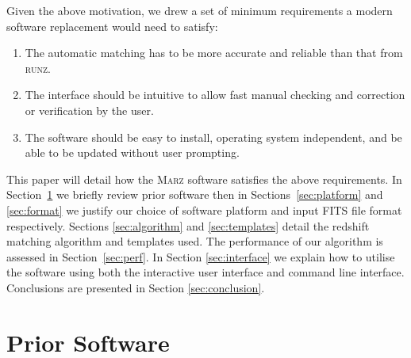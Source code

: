 \documentclass[5p]{elsarticle}
\newcommand{\runz}{\textsc{runz}}
\newcommand{\marz}{\textsc{Marz}}
\begin{document}
Given the above motivation, we drew a set of minimum requirements a modern software replacement would need to satisfy:
\begin{enumerate}
\item The automatic matching has to be more accurate and reliable than that from \runz{}.
\item The interface should be intuitive to allow fast manual checking and correction or verification by the user.
\item The software should be easy to install, operating system independent, and be able to be updated without user prompting.
\end{enumerate}
This paper will detail how the \marz{} software satisfies the above requirements. In Section~\ref{sec:prior} we briefly review prior software then in Sections~\ref{sec:platform} and \ref{sec:format} we justify our choice of software platform and input FITS file format respectively. Sections \ref{sec:algorithm} and \ref{sec:templates} detail the redshift matching algorithm and templates used.  The performance of our algorithm is assessed in Section~\ref{sec:perf}. In Section \ref{sec:interface} we explain how to utilise the software using both the interactive user interface and command line interface. Conclusions are presented in Section \ref{sec:conclusion}.

\section{Prior Software} \label{sec:prior}
\end{document}
